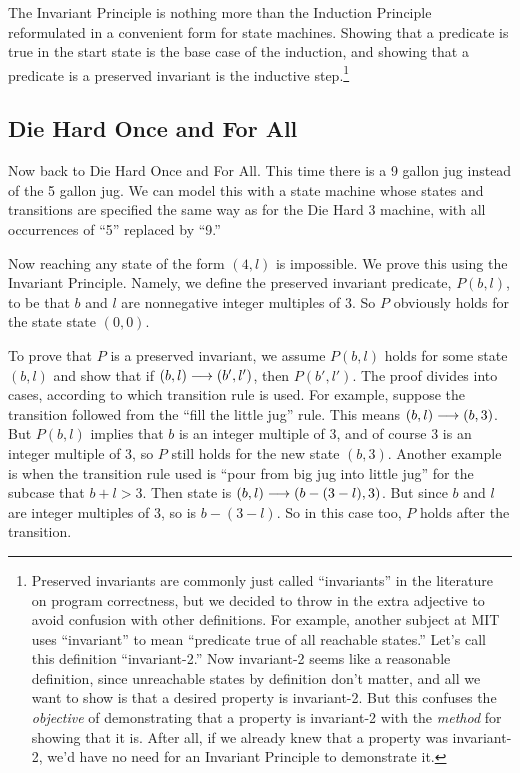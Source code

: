 
The Invariant Principle is nothing more than the Induction Principle
reformulated in a convenient form for state machines.  Showing that a
predicate is true in the start state is the base case of the induction,
and showing that a predicate is a preserved invariant is the inductive
step.\footnote{Preserved invariants are commonly just called
  ``invariants'' in the literature on program correctness, but we decided
  to throw in the extra adjective to avoid confusion with other
  definitions.  For example, another subject at MIT uses ``invariant'' to
  mean ``predicate true of all reachable states.''  Let's call this
  definition ``invariant-2.''  Now invariant-2 seems like a reasonable
  definition, since unreachable states by definition don't matter, and all
  we want to show is that a desired property is invariant-2.  But this
  confuses the \emph{objective} of demonstrating that a property is
  invariant-2 with the \emph{method} for showing that it is.  After all,
  if we already knew that a property was invariant-2, we'd have no need
  for an Invariant Principle to demonstrate it.}

\subsection{Die Hard Once and For All}

Now back to Die Hard Once and For All.  This time there is a 9 gallon jug
instead of the 5 gallon jug.  We can model this with a state machine whose
states and transitions are specified the same way as for the Die Hard 3
machine, with all occurrences of ``5'' replaced by ``9.''

Now reaching any state of the form $(4,l)$ is impossible.  We prove this
using the Invariant Principle.  Namely, we define the preserved invariant
predicate, $P(b,l)$, to be that $b$ and $l$ are nonnegative integer
multiples of 3.  So $P$ obviously holds for the state state $(0,0)$.

To prove that $P$ is a preserved invariant, we assume $P(b,l)$ holds for
some state $(b,l)$ and show that if $(b,l) \mathrel{\longrightarrow} (b',l')$, then
$P(b',l')$.  The proof divides into cases, according to which transition
rule is used.  For example, suppose the transition followed from the
``fill the little jug'' rule.  This means $(b,l) \mathrel{\longrightarrow} (b,3)$.  But
$P(b,l)$ implies that $b$ is an integer multiple of 3, and of course 3 is
an integer multiple of 3, so $P$ still holds for the new state $(b,3)$.
Another example is when the transition rule used is ``pour from big jug
into little jug'' for the subcase that $b + l > 3$.  Then state is $(b,l)
\mathrel{\longrightarrow} (b -( 3 -l), 3)$.  But since $b$ and $l$ are integer multiples of
3, so is $b -( 3 -l)$.  So in this case too, $P$ holds after the
transition.

